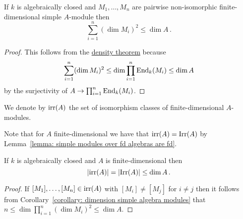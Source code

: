 

\begin{corollary}
  \label{corollary: dimension simple algebra modules}
  If $k$ is algebraically closed and $M_1, \dotsc, M_n$ are pairwise non-iso\-morphic finite-dimensional simple $A$-module then
  \[
          \sum_{i=1}^n (\dim M_i)^2
    \leq  \dim A \,.
  \]
\end{corollary}


\begin{proof}
  This follows from the \hyperref[theorem: density theorem]{density theorem} because
  \[
          \sum_{i=1}^n (\dim M_i)^2
    \leq  \dim \prod_{i=1}^n \operatorname{End}_k(M_i)
    \leq  \dim A
  \]
  by the surjectivity of $A \to \prod_{i=1}^n \operatorname{End}_k(M_i)$.
\end{proof}




\begin{notation}
  We denote by $\operatorname{irr}(A)$ the set of isomorphism classes of finite-dimen\-sional $A$-modules.
\end{notation}


\begin{fluff}
  Note that for $A$ finite-dimensional we have that $\operatorname{irr}(A) = \operatorname{Irr}(A)$ by Lemma~\ref{lemma: simple modules over fd algebras are fd}.
\end{fluff}


\begin{corollary}
  If $k$ is algebraically closed and $A$ is finite-dimensional then
  \[
          |{\operatorname{irr}(A)}|
    =     |{\operatorname{Irr}(A)}|
    \leq  \dim A \,.
  \]
\end{corollary}


\begin{proof}
  If $[M_1], \dotsc, [M_n] \in \operatorname{irr}(A)$ with $[M_i] \neq [M_j]$ for $i \neq j$ then it follows from Corollary~\ref{corollary: dimension simple algebra modules} that $n \leq  \dim \prod_{i=1}^n (\dim M_i)^2 \leq \dim A$.
\end{proof}




